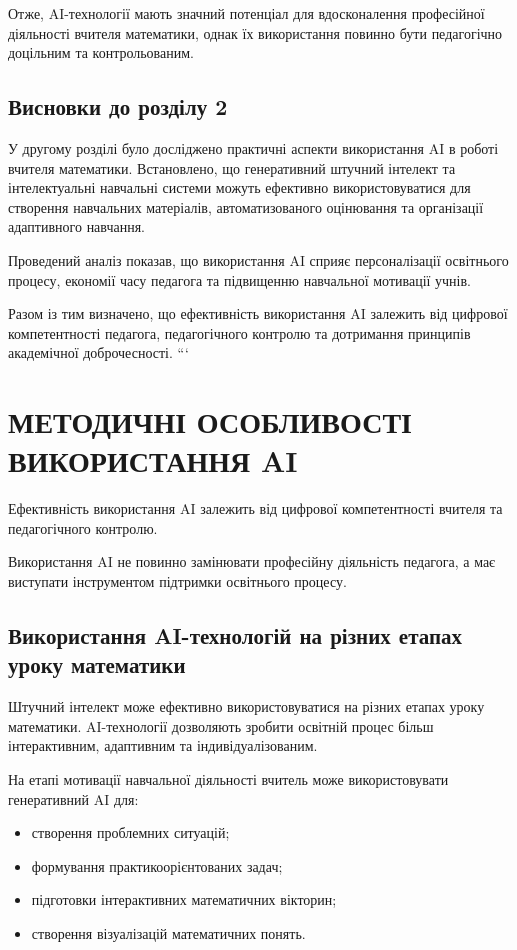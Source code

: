 Отже, AI-технології мають значний потенціал для вдосконалення професійної діяльності вчителя математики, однак їх використання повинно бути педагогічно доцільним та контрольованим.

\subsection*{Висновки до розділу 2}

У другому розділі було досліджено практичні аспекти використання AI в роботі вчителя математики. Встановлено, що генеративний штучний інтелект та інтелектуальні навчальні системи можуть ефективно використовуватися для створення навчальних матеріалів, автоматизованого оцінювання та організації адаптивного навчання.

Проведений аналіз показав, що використання AI сприяє персоналізації освітнього процесу, економії часу педагога та підвищенню навчальної мотивації учнів.

Разом із тим визначено, що ефективність використання AI залежить від цифрової компетентності педагога, педагогічного контролю та дотримання принципів академічної доброчесності.
```



\section{МЕТОДИЧНІ ОСОБЛИВОСТІ ВИКОРИСТАННЯ AI}

Ефективність використання AI залежить від цифрової компетентності вчителя та педагогічного контролю.

Використання AI не повинно замінювати професійну діяльність педагога, а має виступати інструментом підтримки освітнього процесу.





\subsection{Використання AI-технологій на різних етапах уроку математики}

Штучний інтелект може ефективно використовуватися на різних етапах уроку математики. AI-технології дозволяють зробити освітній процес більш інтерактивним, адаптивним та індивідуалізованим.

На етапі мотивації навчальної діяльності вчитель може використовувати генеративний AI для:
\begin{itemize}
\item створення проблемних ситуацій;
\item формування практикоорієнтованих задач;
\item підготовки інтерактивних математичних вікторин;
\item створення візуалізацій математичних понять.
\end{itemize}

